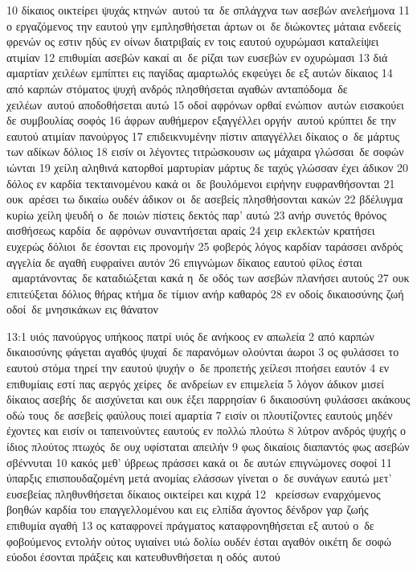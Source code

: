 \documentclass[10pt,oneside,footinclude=true,headinclude=true]{scrbook} %
\begin{document}
10 δίκαιος οικτείρει ψυχάς κτηνών αυτού τα δε σπλάγχνα των ασεβών ανελεήμονα
11 ο εργαζόμενος την εαυτού γην εμπλησθήσεται άρτων οι δε διώκοντες μάταια ενδεείς φρενών ος εστιν ηδύς εν οίνων διατριβαίς εν τοις εαυτού οχυρώμασι καταλείψει ατιμίαν
12 επιθυμίαι ασεβών κακαί αι δε ρίζαι των ευσεβών εν οχυρώμασι
13 διά αμαρτίαν χειλέων εμπίπτει εις παγίδας αμαρτωλός εκφεύγει δε εξ αυτών δίκαιος
14 από καρπών στόματος ψυχή ανδρός πλησθήσεται αγαθών ανταπόδομα δε χειλέων αυτού αποδοθήσεται αυτώ
15 οδοί αφρόνων ορθαί ενώπιον αυτών εισακούει δε συμβουλίας σοφός
16 άφρων αυθήμερον εξαγγέλλει οργήν αυτού κρύπτει δε την εαυτού ατιμίαν πανούργος
17 επιδεικνυμένην πίστιν απαγγέλλει δίκαιος ο δε μάρτυς των αδίκων δόλιος
18 εισίν οι λέγοντες τιτρώσκουσιν ως μάχαιρα γλώσσαι δε σοφών ιώνται
19 χείλη αληθινά κατορθοί μαρτυρίαν μάρτυς δε ταχύς γλώσσαν έχει άδικον
20 δόλος εν καρδία τεκταινομένου κακά οι δε βουλόμενοι ειρήνην ευφρανθήσονται
21 ουκ αρέσει τω δικαίω ουδέν άδικον οι δε ασεβείς πλησθήσονται κακών
22 βδέλυγμα κυρίω χείλη ψευδή ο δε ποιών πίστεις δεκτός παρ' αυτώ
23 ανήρ συνετός θρόνος αισθήσεως καρδία δε αφρόνων συναντήσεται αραίς
24 χειρ εκλεκτών κρατήσει ευχερώς δόλιοι δε έσονται εις προνομήν
25 φοβερός λόγος καρδίαν ταράσσει ανδρός αγγελία δε αγαθή ευφραίνει αυτόν
26 επιγνώμων δίκαιος εαυτού φίλος έσται  αμαρτάνοντας δε καταδιώξεται κακά η δε οδός των ασεβών πλανήσει αυτούς
27 ουκ επιτεύξεται δόλιος θήρας κτήμα δε τίμιον ανήρ καθαρός
28 εν οδοίς δικαιοσύνης ζωή οδοί δε μνησικάκων εις θάνατον
\par
13:1 υιός πανούργος υπήκοος πατρί υιός δε ανήκοος εν απωλεία
2 από καρπών δικαιοσύνης φάγεται αγαθός ψυχαί δε παρανόμων ολούνται άωροι
3 ος φυλάσσει το εαυτού στόμα τηρεί την εαυτού ψυχήν ο δε προπετής χείλεσι πτοήσει εαυτόν
4 εν επιθυμίαις εστί πας αεργός χείρες δε ανδρείων εν επιμελεία
5 λόγον άδικον μισεί δίκαιος ασεβής δε αισχύνεται και ουκ έξει παρρησίαν
6 δικαιοσύνη φυλάσσει ακάκους οδώ τους δε ασεβείς φαύλους ποιεί αμαρτία
7 εισίν οι πλουτίζοντες εαυτούς μηδέν έχοντες και εισίν οι ταπεινούντες εαυτούς εν πολλώ πλούτω
8 λύτρον ανδρός ψυχής ο ίδιος πλούτος πτωχός δε ουχ υφίσταται απειλήν
9 φως δικαίοις διαπαντός φως ασεβών σβέννυται
10 κακός μεθ' ύβρεως πράσσει κακά οι δε αυτών επιγνώμονες σοφοί
11 ύπαρξις επισπουδαζομένη μετά ανομίας ελάσσων γίνεται ο δε συνάγων εαυτώ μετ' ευσεβείας πληθυνθήσεται δίκαιος οικτείρει και κιχρά
12  κρείσσων εναρχόμενος βοηθών καρδία του επαγγελλομένου και εις ελπίδα άγοντος δένδρον γαρ ζωής επιθυμία αγαθή
13 ος καταφρονεί πράγματος καταφρονηθήσεται εξ αυτού ο δε φοβούμενος εντολήν ούτος υγιαίνει υιώ δολίω ουδέν έσται αγαθόν οικέτη δε σοφώ εύοδοι έσονται πράξεις και κατευθυνθήσεται η οδός αυτού
\end{document}
